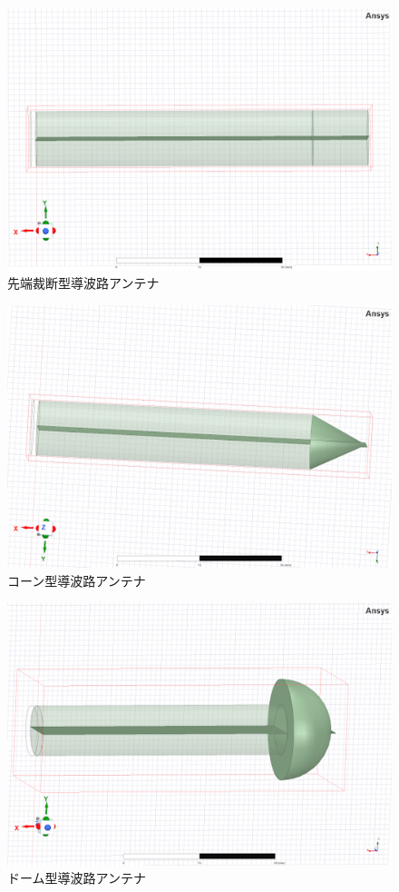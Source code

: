 \documentclass[technicalreport]{ieicej}
\begin{document}
\begin{figure}[tb]
  \begin{center}
    \includegraphics[bb=0 0 384 262, width=0.7\linewidth]{img/normal.pdf}
    \caption{先端裁断型導波路アンテナ}
    \label{fig:normal}
  \end{center}
\end{figure}

\begin{figure}[tb]
  \begin{center}
    \includegraphics[bb=0 0 384 262, width=0.7\linewidth]{img/cone.pdf}
    \caption{コーン型導波路アンテナ}
    \label{fig:cone}
  \end{center}
\end{figure}

\begin{figure}[tb]
  \begin{center}
    \includegraphics[bb=0 0 384 262, width=0.7\linewidth]{img/dome.pdf}
    \caption{ドーム型導波路アンテナ}
    \label{fig:dome}
  \end{center}
\end{figure}
\end{document}
